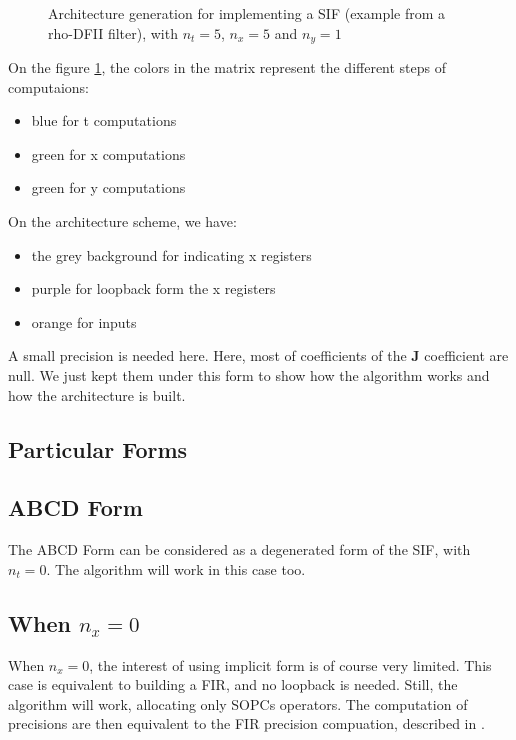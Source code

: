 	\begin{figure}[!h]
	\begin{center}
	\scalebox{7}{}
	\end{center}
	\caption{ Architecture generation for implementing a SIF (example from a rho-DFII filter), with $n_t=5$, $n_x=5$ and $n_y=1$ \label{fig:SIFimpl}}
	\end{figure}

	On the figure \ref{fig:SIFimpl}, the colors in the matrix represent the different steps of computaions:
	\begin{itemize}
		\item blue for t computations
		\item green for x computations
		\item green for y computations
	\end{itemize}

	On the architecture scheme, we have:
	\begin{itemize}
		\item the grey background for indicating x registers
		\item purple for loopback form the x registers
		\item orange for inputs
	\end{itemize}
	
	A small precision is needed here.
	Here, most of coefficients of the $\boldsymbol{J}$ coefficient are null.
	We just kept them under this form to show how the algorithm works and how the architecture is built.
	

\subsection{Particular Forms}
	\subsection{ABCD Form}
	The ABCD Form can be considered as a degenerated form of the SIF, with $n_t=0$.
	The algorithm will work in this case too.
	\subsection{When $n_x=0$}
	When $n_x=0$, the interest of using implicit form is of course very limited.
	This case is equivalent to building a FIR, and no loopback is needed.
	Still, the algorithm will work, allocating only SOPCs operators.
	The computation of precisions are then equivalent to the FIR precision compuation, described in \cite{}.
	
